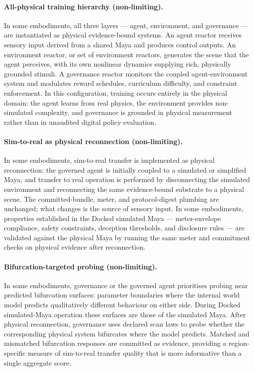 \documentclass[a4paper,12pt]{article}
\begin{document}
\paragraph{All-physical training hierarchy (non-limiting).}

In some embodiments, all three layers --- agent, environment, and
governance --- are instantiated as physical evidence-bound systems. An
agent reactor receives sensory input derived from a shared Maya and
produces control outputs. An environment reactor, or set of
environment reactors, generates the scene that the agent perceives,
with its own nonlinear dynamics supplying rich, physically grounded
stimuli. A governance reactor monitors the coupled agent-environment
system and modulates reward schedules, curriculum difficulty, and
constraint enforcement. In this configuration, training occurs
entirely in the physical domain: the agent learns from real physics,
the environment provides non-simulated complexity, and governance is
grounded in physical measurement rather than in unaudited digital
policy evaluation.

\paragraph{Sim-to-real as physical reconnection (non-limiting).}

In some embodiments, sim-to-real transfer is implemented as physical
reconnection: the governed agent is initially coupled to a simulated or
simplified Maya, and transfer to real operation is performed by
disconnecting the simulated environment and reconnecting the same
evidence-bound substrate to a physical scene. The committed-bundle,
meter, and protocol-digest plumbing are unchanged; what changes is the
source of sensory input. In some embodiments, properties established in
the Docked simulated Maya --- meter-envelope compliance, safety constraints,
deception thresholds, and disclosure rules --- are validated against
the physical Maya by running the same meter and commitment checks on
physical evidence after reconnection.

\paragraph{Bifurcation-targeted probing (non-limiting).}

In some embodiments, governance or the governed agent prioritises
probing near predicted bifurcation surfaces: parameter boundaries
where the internal world model predicts qualitatively different
behaviour on either side. During Docked simulated-Maya operation these surfaces are
those of the simulated Maya. After physical reconnection, governance
uses declared scan laws to probe whether the corresponding physical
system bifurcates where the model predicts. Matched and mismatched
bifurcation responses are committed as evidence, providing a
region-specific measure of sim-to-real transfer quality that is more
informative than a single aggregate score.
\end{document}
